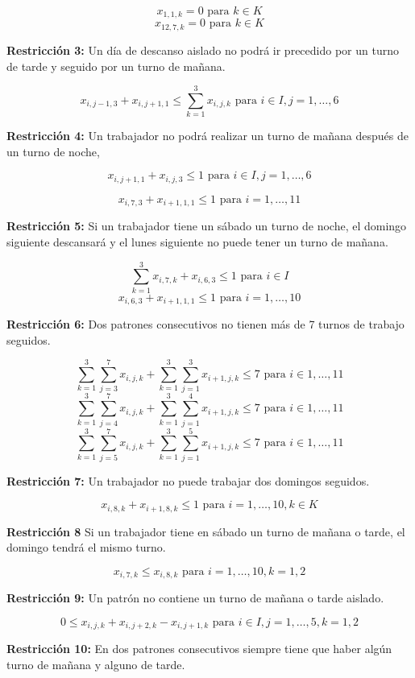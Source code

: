\documentclass[a4paper,12pt]{article}
\begin{document}
$$ x_{1,1,k} = 0 \text{ para } k\in K$$
$$ x_{12,7,k} = 0 \text{ para } k\in K$$

\textbf{Restricci\'on 3:} Un d\'ia de descanso aislado no podr\'a ir precedido por un turno de tarde y seguido por un turno de mañana.

$$ x_{i,j-1,3} + x_{i,j+1,1} \leq \sum_{k=1}^{3} x_{i,j,k} \text{ para } i\in I, j=1,\dots,6$$


\textbf{Restricci\'on 4:} Un trabajador no podr\'a realizar un turno de mañana despu\'es de un turno de noche,

$$ x_{i,j+1,1} + x_{i,j,3} \leq 1 \text{ para } i\in I, j=1,\dots,6$$

$$ x_{i,7,3} + x_{i+1,1,1} \leq 1 \text{ para } i = 1,\dots,11$$

\textbf{Restricci\'on 5:} Si un trabajador tiene un s\'abado un turno de noche, el domingo siguiente descansar\'a y el lunes siguiente no puede tener un turno de mañana.

$$ \sum_{k=1}^{3} x_{i,7,k} + x_{i,6,3} \leq 1 \text{ para } i\in I$$
$$ x_{i,6,3} + x_{i+1,1,1} \leq 1 \text{ para } i = 1,\dots,10$$

\textbf{Restricci\'on 6:} Dos patrones consecutivos no tienen m\'as de 7 turnos de trabajo seguidos.

$$ \sum_{k=1}^{3} \sum_{j=3}^{7} {x_{i,j,k}} + \sum_{k=1}^{3} \sum_{j=1}^{3} {x_{i+1,j,k}} \leq 7 \text{ para } i\in {1,\dots,11}$$
$$ \sum_{k=1}^{3} \sum_{j=4}^{7} {x_{i,j,k}} + \sum_{k=1}^{3} \sum_{j=1}^{4} {x_{i+1,j,k}} \leq 7 \text{ para } i\in {1,\dots,11}$$
$$ \sum_{k=1}^{3} \sum_{j=5}^{7} {x_{i,j,k}} + \sum_{k=1}^{3} \sum_{j=1}^{5} {x_{i+1,j,k}} \leq 7 \text{ para } i\in {1,\dots,11}$$

\textbf{Restricci\'on 7:} Un trabajador no puede trabajar dos domingos seguidos.

$$ x_{i,8,k} + x_{i+1,8,k} \leq 1 \text{ para } i=1,\dots,10 , k\in K$$

\textbf{Restricci\'on 8} Si un trabajador tiene en s\'abado un turno de mañana o tarde, el domingo tendr\'a el mismo turno.

$$ x_{i,7,k} \leq x_{i,8,k} \text{ para } i=1,\dots,10, k=1,2$$

\textbf{Restricci\'on 9:} Un patr\'on no contiene un turno de mañana o tarde aislado.

$$ 0 \leq x_{i,j,k} + x_{i,j+2,k} - x_{i,j+1,k} \text{ para } i\in I, j=1,\dots,5, k=1,2$$ 

\textbf{Restricci\'on 10:} En dos patrones consecutivos siempre tiene que haber alg\'un turno de mañana y alguno de tarde.
\end{document}
